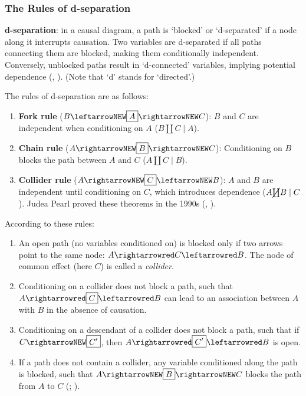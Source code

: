 \documentclass[
  single column]{article}
\providecommand{\tightlist}{%
  \setlength{\itemsep}{0pt}\setlength{\parskip}{0pt}}\usepackage{longtable,booktabs,array}
\begin{document}
\subsubsection{The Rules of
d-separation}\label{the-rules-of-d-separation}

\textbf{d-separation}: in a causal diagram, a path is `blocked' or
`d-separated' if a node along it interrupts causation. Two variables are
d-separated if all paths connecting them are blocked, making them
conditionally independent. Conversely, unblocked paths result in
`d-connected' variables, implying potential dependence
(, ).
(Note that `d' stands for `directed'.)

The rules of d-separation are as follows:

\begin{enumerate}
\def\labelenumi{\arabic{enumi}.}
\tightlist
\item
  \textbf{Fork rule} (\(B \leftarrowNEW \boxed{A} \rightarrowNEW C\)):
  \(B\) and \(C\) are independent when conditioning on \(A\)
  (\(B \coprod C \mid A\)).
\item
  \textbf{Chain rule} (\(A \rightarrowNEW \boxed{B} \rightarrowNEW C\)):
  Conditioning on \(B\) blocks the path between \(A\) and \(C\)
  (\(A \coprod C \mid B\)).
\item
  \textbf{Collider rule}
  (\(A \rightarrowNEW \boxed{C} \leftarrowNEW B\)): \(A\) and \(B\) are
  independent until conditioning on \(C\), which introduces dependence
  (\(A \cancel{\coprod} B \mid C\)). Judea Pearl proved these theorems
  in the 1990s (,
  ).
\end{enumerate}

According to these rules:

\begin{enumerate}
\def\labelenumi{\arabic{enumi}.}
\tightlist
\item
  An open path (no variables conditioned on) is blocked only if two
  arrows point to the same node: \(A \rightarrowred C \leftarrowred B\).
  The node of common effect (here \(C\)) is called a \emph{collider}.
\item
  Conditioning on a collider does not block a path, such that
  \(A \rightarrowred \boxed{C} \leftarrowred B\) can lead to an
  association between \(A\) with \(B\) in the absence of causation.
\item
  Conditioning on a descendant of a collider does not block a path, such
  that if \(C \rightarrowNEW \boxed{C'}\), then
  \(A \rightarrowred \boxed{C'} \leftarrowred B\) is open.
\item
  If a path does not contain a collider, any variable conditioned along
  the path is blocked, such that
  \(A \rightarrowNEW \boxed{B} \rightarrowNEW C\) blocks the path from
  \(A\) to \(C\) (; ).
\end{enumerate}
\end{document}
